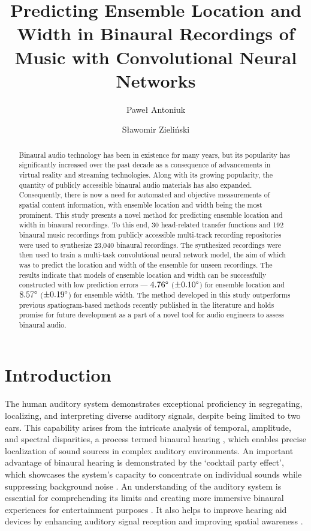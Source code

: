 \documentclass{article}
\title{Predicting Ensemble Location and Width in Binaural Recordings of Music with Convolutional Neural Networks}
\author[1,*]{Paweł Antoniuk}
\author[1]{Sławomir Zieliński}
\affil[1]{Faculty of Computer Science, Białystok University of Technology}
\affil[*]{Corresponding author: pawel.antoniuk@sd.pb.edu.pl}
\date{}
\begin{document}
\maketitle


\begin{abstract}
  Binaural audio technology has been in existence for many years, but its popularity has significantly increased over the past decade as a consequence of advancements in virtual reality and streaming technologies. Along with its growing popularity, the quantity of publicly accessible binaural audio materials has also expanded. Consequently, there is now a need for automated and objective measurements of spatial content information, with ensemble location and width being the most prominent. This study presents a novel method for predicting ensemble location and width in binaural recordings. To this end, 30 head-related transfer functions and 192 binaural music recordings from publicly accessible multi-track recording repositories were used to synthesize 23,040 binaural recordings. The synthesized recordings were then used to train a multi-task convolutional neural network model, the aim of which was to predict the location and width of the ensemble for unseen recordings. The results indicate that models of ensemble location and width can be successfully constructed with low prediction errors --- $4.76\degree$ ($\pm0.10\degree$) for ensemble location and $8.57\degree$ ($\pm0.19\degree$) for ensemble width. The method developed in this study outperforms previous spatiogram-based methods recently published in the literature and holds promise for future development as a part of a novel tool for audio engineers to assess binaural audio.
\end{abstract}

\section{Introduction}

The human auditory system demonstrates exceptional proficiency in segregating, localizing, and interpreting diverse auditory signals, despite being limited to two ears. This capability arises from the intricate analysis of temporal, amplitude, and spectral disparities, a process termed binaural hearing \parencite{blauert_spatial_1996}, which enables precise localization of sound sources in complex auditory environments. An important advantage of binaural hearing is demonstrated by the `cocktail party effect', which showcases the system's capacity to concentrate on individual sounds while suppressing background noise \parencite{cherry_experiments_1953}. An understanding of the auditory system is essential for comprehending its limits and creating more immersive binaural experiences for entertainment purposes \parencite{zhang_surround_2017}. It also helps to improve hearing aid devices by enhancing auditory signal reception and improving spatial awareness \parencite{hirsh_binaural_1950, thiemann_speech_2016}.
\end{document}
